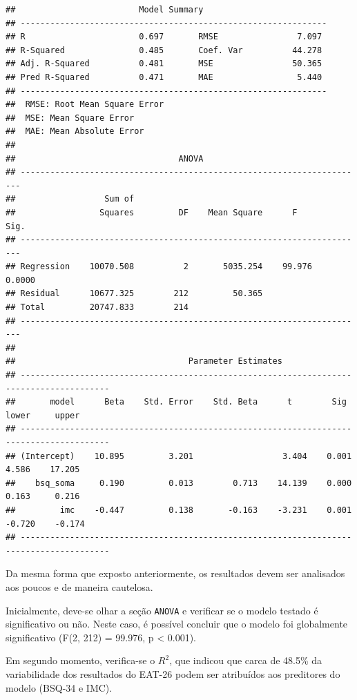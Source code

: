 \documentclass[
]{book}
\begin{document}
\begin{verbatim}
##                         Model Summary                          
## --------------------------------------------------------------
## R                       0.697       RMSE                7.097 
## R-Squared               0.485       Coef. Var          44.278 
## Adj. R-Squared          0.481       MSE                50.365 
## Pred R-Squared          0.471       MAE                 5.440 
## --------------------------------------------------------------
##  RMSE: Root Mean Square Error 
##  MSE: Mean Square Error 
##  MAE: Mean Absolute Error 
## 
##                                 ANOVA                                  
## ----------------------------------------------------------------------
##                  Sum of                                               
##                 Squares         DF    Mean Square      F         Sig. 
## ----------------------------------------------------------------------
## Regression    10070.508          2       5035.254    99.976    0.0000 
## Residual      10677.325        212         50.365                     
## Total         20747.833        214                                    
## ----------------------------------------------------------------------
## 
##                                   Parameter Estimates                                    
## ----------------------------------------------------------------------------------------
##       model      Beta    Std. Error    Std. Beta      t        Sig      lower     upper 
## ----------------------------------------------------------------------------------------
## (Intercept)    10.895         3.201                  3.404    0.001     4.586    17.205 
##    bsq_soma     0.190         0.013        0.713    14.139    0.000     0.163     0.216 
##         imc    -0.447         0.138       -0.163    -3.231    0.001    -0.720    -0.174 
## ----------------------------------------------------------------------------------------
\end{verbatim}

Da mesma forma que exposto anteriormente, os resultados devem ser analisados aos poucos e de maneira cautelosa.

Inicialmente, deve-se olhar a seção \texttt{ANOVA} e verificar se o modelo testado é significativo ou não. Neste caso, é possível concluir que o modelo foi globalmente significativo (F(2, 212) = 99.976, p \textless{} 0.001).

Em segundo momento, verifica-se o \(R^2\), que indicou que carca de 48.5\% da variabilidade dos resultados do EAT-26 podem ser atribuídos aos preditores do modelo (BSQ-34 e IMC).
\end{document}
